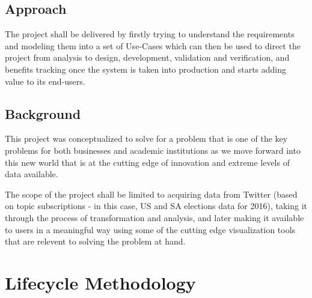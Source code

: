 \documentclass[12pt]{article} %
\begin{document}

\subsection{Approach}

The project shall be delivered by firstly trying to understand the requirements and modeling them into a set of Use-Cases which can then be used to direct the project from analysis to design, development, validation and verification, and benefits tracking once the system is taken into production and starts adding value to its end-users.

	
		
		
	\subsection{Background}
	This project was conceptualized to solve for a problem that is one of the key problems for both businesses and academic institutions as we move forward into this new world that is at the cutting edge of innovation and extreme levels of data available.
	
	The scope of the project shall be limited to acquiring data from Twitter (based on topic subscriptions - in this case, US and SA elections data for 2016), taking it through the process of transformation and analysis, and later making it available to users in a meaningful way using some of the cutting edge visualization tools that are relevent to solving the problem at hand.

	\section{Lifecycle Methodology}
	
\end{document}

